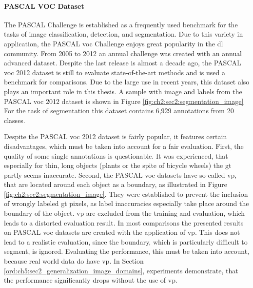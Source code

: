 \paragraph{PASCAL VOC Dataset}

The PASCAL  Challenge \cite{Eve20-PascalVOC} is established as a frequently used benchmark for the tasks of image classification, detection, and segmentation.
Due to this variety in application, the PASCAL \gls{voc} Challenge enjoys great popularity in the \gls{dl} community.
From 2005 to 2012 an annual challenge was created with an annual advanced dataset.
Despite the last release is almost a decade ago, the PASCAL \gls{voc} 2012 dataset is still to evaluate state-of-the-art methods and is used a benchmark for comparisons.
Due to the large use in recent years, this dataset also plays an important role in this thesis.
A sample with image and labels from the PASCAL \gls{voc} 2012 dataset is shown in Figure \ref{fig:ch2:sec2:segmentation_image}
For the task of segmentation this dataset contains 6,929 annotations from 20 classes.

Despite the PASCAL \gls{voc} 2012 dataset is fairly popular, it features certain disadvantages, which must be taken into account for a fair evaluation.
First, the quality of some single annotations is questionable.
It was experienced, that especially for thin, long objects (\eg plants or the spite of bicycle wheels) the \gls{gt} partly seems inaccurate.
Second, the PASCAL \gls{voc} datasets have so-called \gls{vp}, that are located around each object as a boundary, as illustrated in Figure \ref{fig:ch2:sec2:segmentation_image}.
They were established to prevent the inclusion of wrongly labeled \gls{gt} pixels, as label inaccuracies especially take place around the boundary of the object.  
\gls{vp} are excluded from the training and evaluation, which leads to a distorted evaluation result.
In most comparisons the presented results on PASCAL \gls{voc} datasets are created with the application of \gls{vp}.
This does not lead to a realistic evaluation, since the boundary, which is particularly difficult to segment, is ignored.
Evaluating the performance, this must be taken into account, because real world data do have \gls{vp}. 
In Section \ref{ord:ch5:sec2_generalization_image_domains}, experiments demonstrate, that the performance significantly drops without the use of \gls{vp}.

